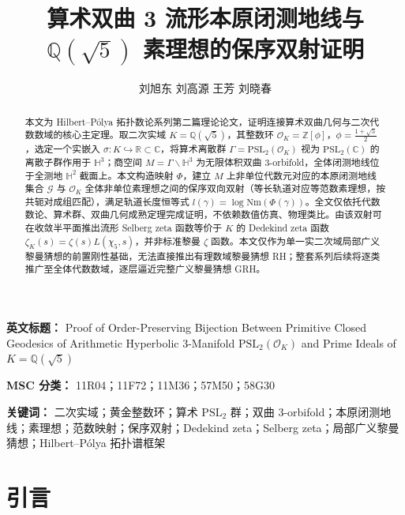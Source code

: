 \documentclass[12pt,a4paper]{article}
\title{\textbf{算术双曲 3 流形本原闭测地线与 $\mathbb{Q}(\sqrt{5})$ 素理想的保序双射证明}}
\author{刘旭东 \quad 刘高源 \quad 王芳 \quad 刘晓春}
\date{}
\begin{document}
\maketitle

\begin{center}
\textbf{英文标题：} Proof of Order-Preserving Bijection Between Primitive Closed Geodesics of Arithmetic Hyperbolic 3-Manifold $\mathrm{PSL}_2(\mathcal{O}_K)$ and Prime Ideals of $K = \mathbb{Q}(\sqrt{5})$
\end{center}

\vspace{0.5cm}

\noindent\textbf{MSC 分类：} 11R04；11F72；11M36；57M50；58G30

\vspace{0.3cm}

\noindent\textbf{关键词：} 二次实域；黄金整数环；算术 $\mathrm{PSL}_2$ 群；双曲 3-orbifold；本原闭测地线；素理想；范数映射；保序双射；Dedekind zeta；Selberg zeta；局部广义黎曼猜想；Hilbert--Pólya 拓扑谱框架

\begin{abstract}
本文为 Hilbert--Pólya 拓扑数论系列第二篇理论论文，证明连接算术双曲几何与二次代数数域的核心主定理。取二次实域 $K = \mathbb{Q}(\sqrt{5})$，其整数环 $\mathcal{O}_K = \mathbb{Z}[\phi]$，$\phi = \frac{1+\sqrt{5}}{2}$，选定一个实嵌入 $\sigma: K \hookrightarrow \mathbb{R} \subset \mathbb{C}$，将算术离散群 $\Gamma = \mathrm{PSL}_2(\mathcal{O}_K)$ 视为 $\mathrm{PSL}_2(\mathbb{C})$ 的离散子群作用于 $\mathbb{H}^3$；商空间 $M = \Gamma\backslash\mathbb{H}^3$ 为无限体积双曲 3-orbifold，全体闭测地线位于全测地 $\mathbb{H}^2$ 截面上。本文构造映射 $\Phi$，建立 $M$ 上非单位代数元对应的本原闭测地线集合 $\mathcal{G}$ 与 $\mathcal{O}_K$ 全体非单位素理想之间的保序双向双射（等长轨道对应等范数素理想，按共轭对成组匹配），满足轨道长度恒等式 $l(\gamma) = \log \mathrm{Nm}(\Phi(\gamma))$。全文仅依托代数数论、算术群、双曲几何成熟定理完成证明，不依赖数值仿真、物理类比。由该双射可在收敛半平面推出流形 Selberg zeta 函数等价于 $K$ 的 Dedekind zeta 函数 $\zeta_K(s) = \zeta(s)L(\chi_5, s)$，并非标准黎曼 $\zeta$ 函数。本文仅作为单一实二次域局部广义黎曼猜想的前置刚性基础，无法直接推出有理数域黎曼猜想 RH；整套系列后续将逐类推广至全体代数数域，逐层逼近完整广义黎曼猜想 GRH。
\end{abstract}

\section{引言}
\end{document}
